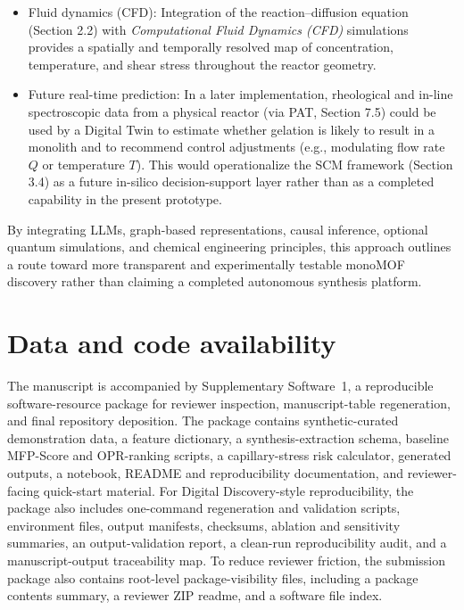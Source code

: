 \documentclass[12pt,a4paper]{article}
\begin{document}
\begin{itemize}
    \item Fluid dynamics (CFD): Integration of the reaction–diffusion equation (Section 2.2) with \textit{Computational Fluid Dynamics (CFD)} simulations provides a spatially and temporally resolved map of concentration, temperature, and shear stress throughout the reactor geometry.
    \item Future real-time prediction: In a later implementation, rheological and in-line spectroscopic data from a physical reactor (via PAT, Section 7.5) could be used by a Digital Twin to estimate whether gelation is likely to result in a monolith and to recommend control adjustments (e.g., modulating flow rate $Q$ or temperature $T$). This would operationalize the SCM framework (Section 3.4) as a future in-silico decision-support layer rather than as a completed capability in the present prototype.
\end{itemize}

By integrating LLMs, graph-based representations, causal inference, optional quantum simulations, and chemical engineering principles, this approach outlines a route toward more transparent and experimentally testable monoMOF discovery rather than claiming a completed autonomous synthesis platform.



\appendix




\section*{Data and code availability}
The manuscript is accompanied by Supplementary Software~1, a reproducible software-resource package for reviewer inspection, manuscript-table regeneration, and final repository deposition. The package contains synthetic-curated demonstration data, a feature dictionary, a synthesis-extraction schema, baseline MFP-Score and OPR-ranking scripts, a capillary-stress risk calculator, generated outputs, a notebook, README and reproducibility documentation, and reviewer-facing quick-start material. For Digital Discovery-style reproducibility, the package also includes one-command regeneration and validation scripts, environment files, output manifests, checksums, ablation and sensitivity summaries, an output-validation report, a clean-run reproducibility audit, and a manuscript-output traceability map. To reduce reviewer friction, the submission package also contains root-level package-visibility files, including a package contents summary, a reviewer ZIP readme, and a software file index.
\end{document}

